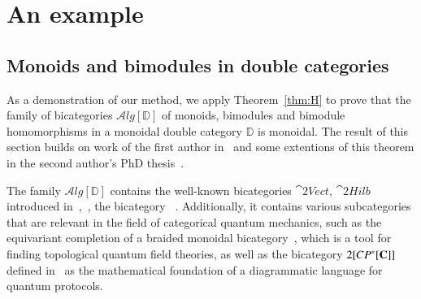 \section{An example}\label{sec:Alg} 

\subsection*{Monoids and bimodules in double categories}
\label{sec:mod}

As a demonstration of our method, we apply Theorem~\ref{thm:H} to prove that the family of bicategories $\mathcal{A}lg[{\mathbb{D}}]$ of monoids, bimodules and bimodule homomorphisms in a monoidal double category $\mathbb{D}$ is monoidal. The result of this section builds on work of the first author in~\cite[Theorem 11.5]{shulman:frbi} and some extentions of this theorem in the second author's PhD thesis~\cite[Chapter 5]{westerPhDthesis}.

The family $\mathcal{A}lg[{\mathbb{D}}]$ contains the well-known bicategories $\cat{2Vect}$, $\cat{2Hilb}$  introduced in~\cite{kapranov562},~\cite{baez2004higher}, the bicategory ~\cite{benabou}. Additionally, it contains various subcategories that are relevant in the field of categorical quantum mechanics, such as the equivariant completion of a braided monoidal bicategory~\cite{carquevillerunkel}, which is a tool for finding topological quantum field theories, as well as the bicategory $2[CP^*[{\bf C}]]$ defined in~\cite{heunenvicarywester} as the mathematical foundation of a diagrammatic language for quantum protocols. %

